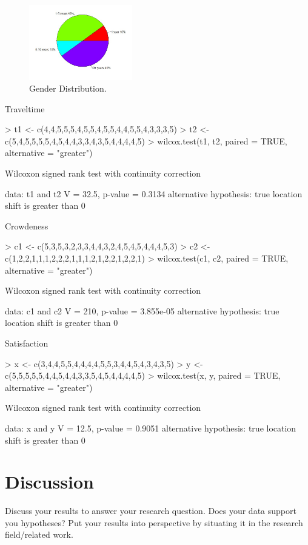 \begin{figure}[!ht]
  \centering
  \includegraphics[width=0.4\textwidth]{images/LivingTimeDistribution.jpg}
  \caption{
  Gender Distribution.
  }
  \label{figure:GenderDistribution}
\end{figure}

Traveltime

> t1 <- c(4,4,5,5,5,4,5,5,4,5,5,4,4,5,5,4,3,3,3,5)
> t2 <- c(5,4,5,5,5,5,4,5,4,4,3,3,4,3,5,4,4,4,4,5)
> wilcox.test(t1, t2, paired = TRUE, alternative = "greater")

	Wilcoxon signed rank test with continuity correction

data:  t1 and t2
V = 32.5, p-value = 0.3134
alternative hypothesis: true location shift is greater than 0


Crowdeness

> c1 <- c(5,3,5,3,2,3,3,4,4,3,2,4,5,4,5,4,4,4,5,3)
> c2 <- c(1,2,2,1,1,1,2,2,2,1,1,1,2,1,2,2,1,2,2,1)
> wilcox.test(c1, c2, paired = TRUE, alternative = "greater")

	Wilcoxon signed rank test with continuity correction

data:  c1 and c2
V = 210, p-value = 3.855e-05
alternative hypothesis: true location shift is greater than 0


Satisfaction

> x <- c(3,4,4,5,5,4,4,4,4,5,5,3,4,4,5,4,3,4,3,5)
> y <- c(5,5,5,5,5,4,4,5,4,4,3,3,5,4,5,4,4,4,4,5)
> wilcox.test(x, y, paired = TRUE, alternative = "greater")

	Wilcoxon signed rank test with continuity correction

data:  x and y
V = 12.5, p-value = 0.9051
alternative hypothesis: true location shift is greater than 0



\section{Discussion}
Discuss your results to answer your research question. Does your data support you hypotheses? Put your results into perspective by situating it in the research field/related work.

